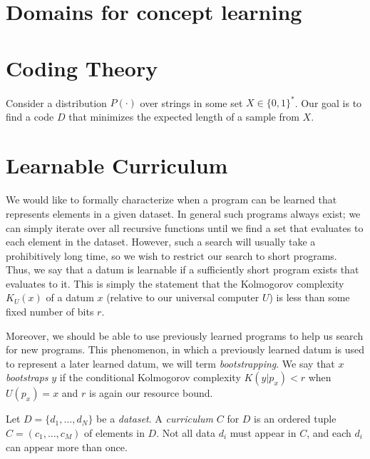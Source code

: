 \documentclass{article}
\begin{document}
\section{Domains for concept learning}

\section{Coding Theory}
Consider a distribution $P(\cdot)$ over strings in some set $X \in
\{0, 1\}^*$. Our goal is to find a code $D$ that minimizes the
expected length of a sample from $X$.

\section{Learnable Curriculum}
We would like to formally characterize when a program can be learned
that represents elements in a given dataset. In general such programs
always exist; we can simply iterate over all recursive functions until
we find a set that evaluates to each element in the dataset. However,
such a search will usually take a prohibitively long time, so we wish
to restrict our search to short programs.  Thus, we say that a datum
is learnable if a sufficiently short program exists that evaluates to
it. This is simply the statement that the Kolmogorov complexity
$K_U(x)$ of a datum $x$ (relative to our universal computer $U$) is
less than some fixed number of bits $r$. 

Moreover, we should be able to use previously learned programs to help
us search for new programs. This phenomenon, in which a previously
learned datum is used to represent a later learned datum, we will term
\emph{bootstrapping}. We say that $x$ \emph{bootstraps} $y$ if the
conditional Kolmogorov complexity $K(y | p_x) < r$ when $U(p_x) = x$ and
$r$ is again our resource bound. 

Let $D= \{d_1, \dots, d_N\}$ be a \emph{dataset}. A \emph{curriculum}
$C$ for $D$ is an ordered tuple $C = (c_1, \dots, c_M)$ of elements in
$D$. Not all data $d_i$ must appear in $C$, and each $d_i$ can appear
more than once.
\end{document}
